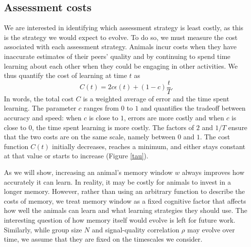 \subsection{Assessment costs }
We are interested in identifying which assessment strategy is least costly, as this is the strategy we would expect to evolve. To do so, we must measure the cost associated with each assessment strategy. Animals incur costs when they have inaccurate estimates of their peers' quality and by continuing to spend time learning about each other when they could be engaging in other activities. We thus quantify the cost of learning at time $t$ as 
\begin{equation*}
C(t) = 2c\epsilon(t) +(1-c)\frac{t}{T}.
\end{equation*}  
In words, the total cost $C$ is a weighted average of error and the time spent learning. The parameter $c$ ranges from $0$ to $1$ and quantifies the tradeoff between accuracy and speed: when $c$ is close to $1$, errors are more costly and when $c$ is close to $0$, the time spent learning is more costly. The factors of $2$ and $1/T$ ensure that the two costs are on the same scale, namely between $0$ and $1$. 
The cost function $C(t)$ initially decreases, reaches a minimum, and either stays constant at that value or starts to increase (Figure \ref{tau}). 

As we will show, increasing an animal's memory window $w$ always improves how accurately it can learn. In reality, it may be costly for animals to invest in a longer memory. However, rather than using an arbitrary function to describe the costs of memory, we treat memory window as a fixed cognitive factor that affects how well the animals can learn and what learning strategies they should use. The interesting question of how memory itself would evolve is left for future work. Similarly, while group size $N$ and signal-quality correlation $\rho$ may evolve over time, we assume that they are fixed on the timescales we consider. 


